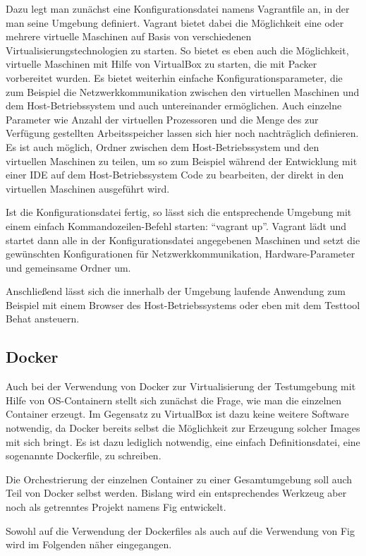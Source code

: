 Dazu legt man zunächst eine Konfigurationsdatei namens Vagrantfile an, in der man seine Umgebung definiert. Vagrant bietet dabei die Möglichkeit eine oder mehrere virtuelle Maschinen auf Basis von verschiedenen Virtualisierungstechnologien zu starten. So bietet es eben auch die Möglichkeit, virtuelle Maschinen mit Hilfe von VirtualBox zu starten, die mit Packer vorbereitet wurden. Es bietet weiterhin einfache Konfigurationsparameter, die zum Beispiel die Netzwerkkommunikation zwischen den virtuellen Maschinen und dem Host-Betriebssystem und auch untereinander ermöglichen. Auch einzelne Parameter wie Anzahl der virtuellen Prozessoren und die Menge des zur Verfügung gestellten Arbeitsspeicher lassen sich hier noch nachträglich definieren. Es ist auch möglich, Ordner zwischen dem Host-Betriebssystem und den virtuellen Maschinen zu teilen, um so zum Beispiel während der Entwicklung mit einer IDE auf dem Host-Betriebssystem Code zu bearbeiten, der direkt in den virtuellen Maschinen ausgeführt wird.

Ist die Konfigurationsdatei fertig, so lässt sich die entsprechende Umgebung mit einem einfach Kommandozeilen-Befehl starten: "`vagrant up"'. Vagrant lädt und startet dann alle in der Konfigurationsdatei angegebenen Maschinen und setzt die gewünschten Konfigurationen für Netzwerkkommunikation, Hardware-Parameter und gemeinsame Ordner um.

Anschließend lässt sich die innerhalb der Umgebung laufende Anwendung zum Beispiel mit einem Browser des Host-Betriebssystems oder eben mit dem Testtool Behat ansteuern.

\subsection{Docker}

Auch bei der Verwendung von Docker zur Virtualisierung der Testumgebung mit Hilfe von OS-Containern stellt sich zunächst die Frage, wie man die einzelnen Container erzeugt. Im Gegensatz zu VirtualBox ist dazu keine weitere Software notwendig, da Docker bereits selbst die Möglichkeit zur Erzeugung solcher Images mit sich bringt. Es ist dazu lediglich notwendig, eine einfach Definitionsdatei, eine sogenannte Dockerfile, zu schreiben.

Die Orchestrierung der einzelnen Container zu einer Gesamtumgebung soll auch Teil von Docker selbst werden. Bislang wird ein entsprechendes Werkzeug aber noch als getrenntes Projekt namens Fig entwickelt.

Sowohl auf die Verwendung der Dockerfiles als auch auf die Verwendung von Fig wird im Folgenden näher eingegangen.

